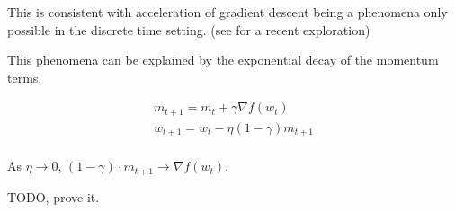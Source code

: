 This is consistent with acceleration of gradient descent being a phenomena only possible in the discrete time setting. (see \cite{Betancourt2018} for a recent exploration)

This phenomena can be explained by the exponential decay of the momentum terms.

\begin{align}
m_{t+1} = m_t + \gamma\nabla f(w_t) \\
w_{t+1} = w_t - \eta (1-\gamma) m_{t+1} \\
\end{align}

As \(\eta \to 0\), \((1-\gamma) \cdot m_{t+1} \to \nabla f(w_t)\).

TODO, prove it.
